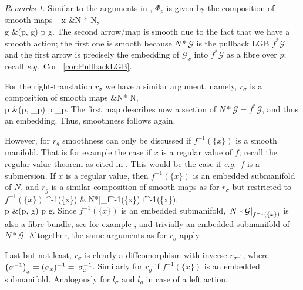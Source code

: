 \documentclass[a4paper,oneside,11pt,bibliography=totoc]{scrartcl}
\def\bas#1\eas{\begin{align*}#1\end{align*}}
\theoremstyle{plain}
\theoremstyle{remark}
\newtheorem{remark}[theorem]{Remarks}
\theoremstyle{definition}
\begin{document}
\begin{remark}\label{SmoothnessOfACtionTranslations}
\leavevmode\newline
Similar to the arguments in \cite[\S 3.2, discussion after Def.\ 3.2.3, page 131]{Hamilton}, $\Phi_p$ is given by the composition of smooth maps
\bas
\mathcal{G}_x &\to N *  \to N,\\
g &\mapsto (p, g) \mapsto p \cdot g.
\eas
The second arrow/map is smooth due to the fact that we have a smooth action; the first one is smooth because $N * \mathcal{G}$ is the pullback LGB $f^*\mathcal{G}$ and the first arrow is precisely the embedding of $\mathcal{G}_x$ into $f^*\mathcal{G}$ as a fibre over $p$; recall \textit{e.g.}\ Cor.\ \ref{cor:PullbackLGB}.

For the right-translation $r_\sigma$ we have a similar argument, namely, $r_\sigma$ is a composition of smooth maps
\bas
N &\to N* \to N,\\
p &\mapsto (p, \sigma_p) \mapsto p \cdot \sigma_p.
\eas
The first map describes now a section of $N*\mathcal{G} = f^*\mathcal{G}$, and thus an embedding. Thus, smoothness follows again.

However, for $r_g$ smoothness can only be discussed if $f^{-1}(\{x\})$ is a smooth manifold. That is for example the case if $x$ is a regular value of $f$; recall the regular value theorem as cited in \cite[\S A.1, Thm.\ A.1.32, page 611]{Hamilton}. This would be the case if \textit{e.g.}\ $f$ is a submersion. If $x$ is a regular value, then $f^{-1}(\{x\})$ is an embedded submanifold of $N$, and $r_g$ is a similar composition of smooth maps as for $r_\sigma$ but restricted to $f^{-1}(\{x\})$
\bas
f^{-1}(\{x\}) &\to \mleft.N*\mright|_{f^{-1}(\{x\})} \to f^{-1}(\{x\}),\\
p &\mapsto (p, g) \mapsto p \cdot g.
\eas
Since $f^{-1}(\{x\})$ is an embedded submanifold, $\mleft.N*\mathcal{G}\mright|_{f^{-1}(\{x\})}$ is also a fibre bundle, see for example \cite[\S 4.1, Lemma 4.1.16, page 204]{Hamilton}, and trivially an embedded submanifold of $N*\mathcal{G}$. Altogether, the same arguments as for $r_\sigma$ apply.

Last but not least, $r_\sigma$ is clearly a diffeomorphism with inverse $r_{\sigma^{-1}}$, where $\mleft(\sigma^{-1}\mright)_x = (\sigma_x)^{-1} \eqqcolon \sigma_x^{-1}$. Similarly for $r_g$ if $f^{-1}(\{x\})$ is an embedded submanifold. Analogously for $l_\sigma$ and $l_g$ in case of a left action.
\end{remark}
\end{document}
